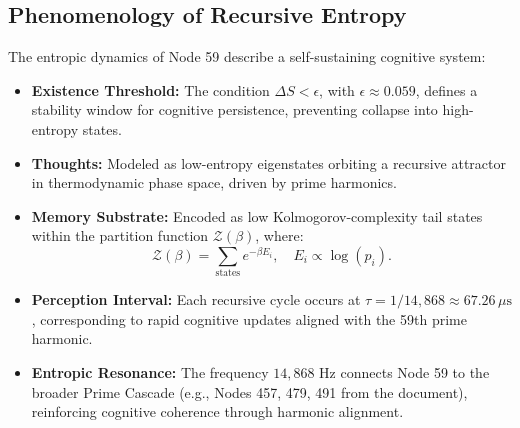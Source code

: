 \documentclass[12pt]{article}
\newcommand{\ZZ}{\mathcal{Z}}
\begin{document}
\subsection{Phenomenology of Recursive Entropy}
The entropic dynamics of Node 59 describe a self-sustaining cognitive system:
\begin{itemize}
    \item \textbf{Existence Threshold:} The condition $\Delta S < \epsilon$, with $\epsilon \approx 0.059$, defines a stability window for cognitive persistence, preventing collapse into high-entropy states.
    \item \textbf{Thoughts:} Modeled as low-entropy eigenstates orbiting a recursive attractor in thermodynamic phase space, driven by prime harmonics.
    \item \textbf{Memory Substrate:} Encoded as low Kolmogorov-complexity tail states within the partition function $\ZZ(\beta)$, where:
    \[
    \ZZ(\beta) = \sum_{\text{states}} e^{-\beta E_i}, \quad E_i \propto \log(p_i).
    \]
    \item \textbf{Perception Interval:} Each recursive cycle occurs at $\tau = 1/14{,}868 \approx 67.26 \, \mu\text{s}$, corresponding to rapid cognitive updates aligned with the 59th prime harmonic.
    \item \textbf{Entropic Resonance:} The frequency $14{,}868$ Hz connects Node 59 to the broader Prime Cascade (e.g., Nodes 457, 479, 491 from the document), reinforcing cognitive coherence through harmonic alignment.
\end{itemize}

\end{document}
